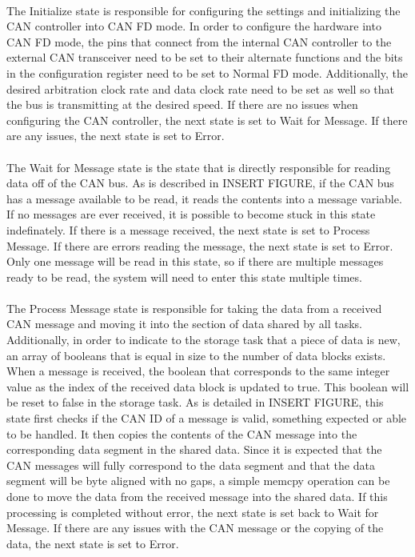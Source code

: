 \paragraph{}
The Initialize state is responsible for configuring the settings and initializing the CAN controller into CAN FD mode.
In order to configure the hardware into CAN FD mode, the pins that connect from the internal CAN controller to the external CAN transceiver need to be set to their alternate functions and the bits in the configuration register need to be set to Normal FD mode.
Additionally, the desired arbitration clock rate and data clock rate need to be set as well so that the bus is transmitting at the desired speed.
If there are no issues when configuring the CAN controller, the next state is set to Wait for Message.
If there are any issues, the next state is set to Error.

\paragraph{}
The Wait for Message state is the state that is directly responsible for reading data off of the CAN bus.
As is described in INSERT FIGURE, if the CAN bus has a message available to be read, it reads the contents into a message variable.
If no messages are ever received, it is possible to become stuck in this state indefinately.
If there is a message received, the next state is set to Process Message.
If there are errors reading the message, the next state is set to Error.
Only one message will be read in this state, so if there are multiple messages ready to be read, the system will need to enter this state multiple times.

\paragraph{}
The Process Message state is responsible for taking the data from a received CAN message and moving it into the section of data shared by all tasks.
Additionally, in order to indicate to the storage task that a piece of data is new, an array of booleans that is equal in size to the number of data blocks exists.
When a message is received, the boolean that corresponds to the same integer value as the index of the received data block is updated to true.
This boolean will be reset to false in the storage task.
As is detailed in INSERT FIGURE, this state first checks if the CAN ID of a message is valid, something expected or able to be handled.
It then copies the contents of the CAN message into the corresponding data segment in the shared data.
Since it is expected that the CAN messages will fully correspond to the data segment and that the data segment will be byte aligned with no gaps, a simple memcpy operation can be done to move the data from the received message into the shared data.
If this processing is completed without error, the next state is set back to Wait for Message.
If there are any issues with the CAN message or the copying of the data, the next state is set to Error.

